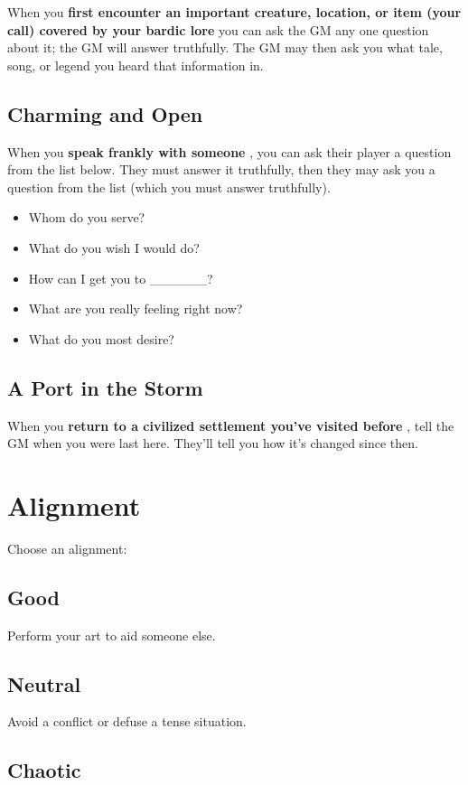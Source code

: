  When you \textbf{first encounter an important creature, location, or item (your call) covered by your bardic lore}
 you can ask the GM any one question about it; the GM will answer truthfully. The GM may then ask you what tale, song, or legend you heard that information in.
\subsection{Charming and Open}


 When you \textbf{speak frankly with someone}
, you can ask their player a question from the list below. They must answer it truthfully, then they may ask you a question from the list (which you must answer truthfully).
\begin{itemize}
\item Whom do you serve?
\item What do you wish I would do?
\item How can I get you to \_\_\_\_\_\_?
\item What are you really feeling right now?
\item What do you most desire?

\end{itemize}
\subsection{A Port in the Storm}


 When you \textbf{return to a civilized settlement you've visited before}
, tell the GM when you were last here. They'll tell you how it's changed since then.
\section{Alignment}


 Choose an alignment:
\subsection{Good}


 Perform your art to aid someone else.
\subsection{Neutral}


 Avoid a conflict or defuse a tense situation.
\subsection{Chaotic}


